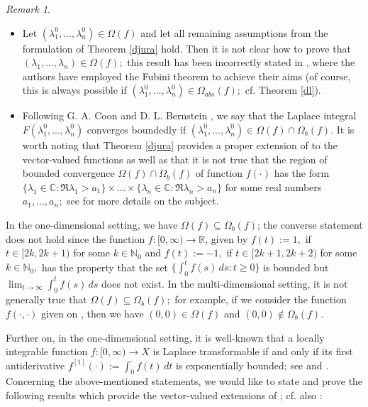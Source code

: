 \documentclass{amsart}
\theoremstyle{definition}
\theoremstyle{remark}
\newtheorem{rem}[thm]{Remark}
\numberwithin{equation}{section}
\begin{document}
\begin{rem}\label{coolcats}
\begin{itemize}
\item[(i)]
Let $(\lambda_{1}^{0},...,\lambda_{n}^{0})\in \Omega(f)$ and let all remaining assumptions from the formulation of Theorem \ref{djura} hold. Then it is not clear how to prove that $(\lambda_{1},...,\lambda_{n})\in \Omega(f);$ this result has been incorrectly stated in \cite[Theorem 2.1]{simplify}, where the authors have employed the Fubini theorem to achieve their aims (of course, this is always possible if $(\lambda_{1}^{0},...,\lambda_{n}^{0})\in \Omega_{abs}(f);$ cf. Theorem \ref{dl}). 
\item[(ii)]
Following  G. A. Coon and D. L. Bernstein \cite{bern1}, we say that the Laplace integral $F(\lambda_{1}^{0},...,\lambda_{n}^{0})$  converges boundedly if $(\lambda_{1}^{0},...,\lambda_{n}^{0})\in \Omega(f) \cap \Omega_{b}(f)$. It is worth noting that Theorem \ref{djura} provides a proper extension of \cite[Theorem 2.1(a)]{bern1} to the vector-valued functions as well as that it is not true that the region of bounded convergence $\Omega(f) \cap \Omega_{b}(f)$ of function $f(\cdot)$ has the form 
$\{ \lambda_{1}\in {\mathbb C} : \Re \lambda_{1}>a_{1} \} \times ... \times  \{ \lambda_{n}\in {\mathbb C} : \Re \lambda_{n}>a_{n}\}$ for some real numbers $a_{1},..., a_{n};$ see \cite[p. 145,  l. -13- l. -8]{bern1} for more details on the subject.
\end{itemize}
\end{rem}

In the one-dimensional setting, we have $\Omega(f)\subseteq \Omega_{b}(f)$; the converse statement does not hold since the function $f: [0,\infty) \rightarrow {\mathbb R}$, given by $f(t):=1,$ if $t\in [2k,2k+1)$ for some $k\in {\mathbb N}_{0}$ and $f(t):=-1,$ if $t\in [2k+1,2k+2)$ for some $k\in {\mathbb N}_{0},$ has the property that the set $\{ \int^{t}_{0}f(s)\, ds : t\geq 0\}$ is bounded but $\lim_{t\rightarrow \infty}\int^{t}_{0}f(s)\, ds$ does not exist. In the multi-dimensional setting, it is not generally true that $\Omega(f)\subseteq \Omega_{b}(f);$  for example, if we consider the function $f(\cdot,\cdot)$ given on \cite[p. 144, l. 16--l. 19]{bern1}, then we have $(0,0)\in \Omega(f)$ and $(0,0)\notin \Omega_{b}(f).$ 

Further on, in the one-dimensional setting, it is well-known that a locally integrable function $f: [0,\infty) \rightarrow X$ is Laplace transformable if and only if its first antiderivative $f^{[1]}(\cdot):=\int^{\cdot}_{0}f(t)\, dt$ is exponentially bounded; see \cite[Theorem 1.4.3]{a43} and \cite[Theorem 1.4.1(v)]{FKP}. Concerning the above-mentioned statements, we would like to state and prove the following results which provide the vector-valued extensions of \cite[Theorem 2.2, Theorem 2.3, Theorem 2.4]{bern1}; cf. also \cite[Theorem 2.7-Theorem 2.10 and Corollary 1-Corollary 2]{bern1}:
\end{document}
